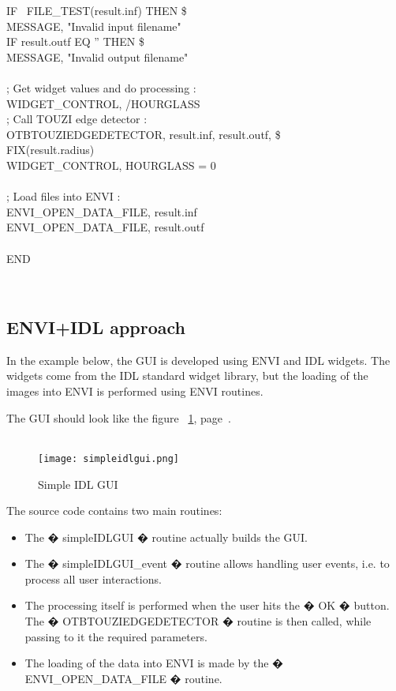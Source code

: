 \begin{scriptsize}
\indent IF ~FILE\_TEST(result.inf) THEN \$\\
\indent \indent MESSAGE, "Invalid input filename"\\
\indent IF result.outf EQ '' THEN \$\\
\indent \indent MESSAGE, "Invalid output filename"\\
\\
\indent ; Get widget values and do processing :\\
\indent WIDGET\_CONTROL, /HOURGLASS\\
\indent ; Call TOUZI edge detector :\\
\indent OTBTOUZIEDGEDETECTOR, result.inf, result.outf, \$\\
\indent FIX(result.radius)\\
\indent WIDGET\_CONTROL, HOURGLASS = 0\\
\\
\indent ; Load files into ENVI :\\
\indent ENVI\_OPEN\_DATA\_FILE, result.inf\\
\indent ENVI\_OPEN\_DATA\_FILE, result.outf\\
\\
\indent END
\end{scriptsize}
\\

\subsection{ENVI+IDL approach}
In the example below, the GUI is developed using ENVI and IDL widgets. The widgets come from the IDL standard widget library, 
but the loading of the images into ENVI is performed using ENVI routines.

The GUI should look like the figure ~\ref{simpleidlgui}, page~\pageref{simpleidlgui}.
\\
\\
\begin{figure}
\label{simpleidlgui}
\begin{center}
\texttt{[image: simpleidlgui.png]}
\caption{Simple IDL GUI}
\end{center}
\end{figure}

The source code contains two main routines:
\begin{itemize}
    \item The � simpleIDLGUI � routine actually builds the GUI.
    \item The � simpleIDLGUI\_event � routine allows handling user events, i.e. to process all user interactions.
    \item The processing itself is performed when the user hits the � OK � button. The � OTBTOUZIEDGEDETECTOR � routine is then called, while passing to it the required parameters.
    \item The loading of the data into ENVI is made by the � ENVI\_OPEN\_DATA\_FILE � routine.
\end{itemize}

